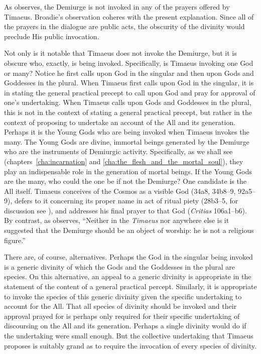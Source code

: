 As \citet[13--4]{Broadie:2012vl} observes, the Demiurge is not invoked in any of the prayers offered by Timaeus. Broadie's observation coheres with the present explanation. Since all of the prayers in the dialogue are public acts, the obscurity of the divinity would preclude His public invocation.

Not only is it notable that Timaeus does not invoke the Demiurge, but it is obscure who, exactly, is being invoked. Specifically, is Timaeus invoking one God or many? Notice he first calls upon God in the singular and then upon Gods and Goddesses in the plural. When Timaeus first calls upon God in the singular, it is in stating the general practical precept to call upon God and pray for approval of one's undertaking. When Timaeus calls upon Gods and Goddesses in the plural, this is not in the context of stating a general practical precept, but rather in the context of proposing to undertake an account of the All and its generation. Perhaps it is the Young Gods who are being invoked when Timaeus invokes the many. The Young Gods are divine, immortal beings generated by the Demiurge who are the instruments of Demiurgic activity. Specifically, as we shall see (chapters~\ref{cha:incarnation} and \ref{cha:the_flesh_and_the_mortal_soul}), they play an indispensable role in the generation of mortal beings. If the Young Gods are the many, who could the one be if not the Demiurge? One candidate is the All itself. Timaeus conceives of the Cosmos as a visible God (34a8, 34b8--9, 92a5--9), defers to it concerning its proper name in act of ritual piety (28b3--5, for discussion see \citealt[66]{Taylor:1928qb}), and addresses his final prayer to that God (\emph{Critias} 106a1--b6). By contrast, as \citet[35]{Cornford:1935fk} observes, ``Neither in the \emph{Timaeus} nor anywhere else is it suggested that the Demiurge should be an object of worship: he is not a religious figure.''

There are, of course, alternatives. Perhaps the God in the singular being invoked is a generic divinity of which the Gods and the Goddesses in the plural are species. On this alternative, an appeal to a generic divinity is appropriate in the statement of the content of a general practical percept. Similarly, it is appropriate to invoke the species of this generic divinity given the specific undertaking to account for the All. That all species of divinity should be invoked and their approval prayed for is perhaps only required for their specific undertaking of discoursing on the All and its generation. Perhaps a single divinity would do if the undertaking were small enough. But the collective undertaking that Timaeus proposes is suitably grand as to require the invocation of every species of divinity.

